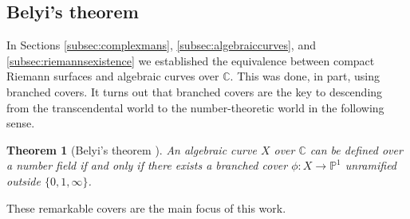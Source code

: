 \documentclass{dcthesis}
\newcommand{\PP}{\mathbb P}
\newcommand{\CC}{\mathbb C}
\newtheorem{theorem}[prop]{Theorem}
\theoremstyle{definition}
\theoremstyle{remark}
\numberwithin{equation}{section}
\numberwithin{figure}{section}
\begin{document}
{{    \subsection{Belyi's theorem}{\label{subsec:belyistheorem}
      In Sections
      \ref{subsec:complexmans}, \ref{subsec:algebraiccurves},
      and \ref{subsec:riemannsexistence}
      we established the equivalence between
      compact Riemann surfaces and algebraic curves over $\CC$.
      This was done, in part,
      using branched covers.
      It turns out that branched covers are the key
      to descending from the transcendental world to
      the number-theoretic world in the following sense.
      \begin{theorem}[Belyi's theorem \cite{belyi}]\label{thm:belyistheorem}
        An algebraic curve $X$ over $\CC$ can be defined over a number field
        if and only if there exists a branched cover
        $\phi\colon X\to\PP^1$ unramified outside
        $\{0,1,\infty\}$.
      \end{theorem}
      These remarkable covers are the main focus of this work.
    }
}}
\end{document}
